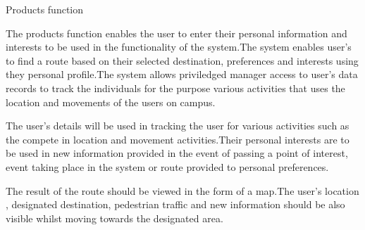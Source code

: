 Products function

The products function enables the user to enter their personal information and interests to be used in the functionality of the system.The system enables user's to find a route based on their selected destination, preferences and interests using they personal profile.The system allows priviledged manager access to user's data records to track the individuals for the purpose various activities that uses the location and movements of the users on campus.

The user's details will be used in tracking the user for various activities such as the compete in location and movement activities.Their personal interests are to be used in new information provided in the event of passing a point of interest, event taking place in the system or route provided to personal preferences.

The result of the route should be viewed in the form of a map.The user's location , designated destination,  pedestrian traffic and new information should be also visible whilst moving towards the designated area.

